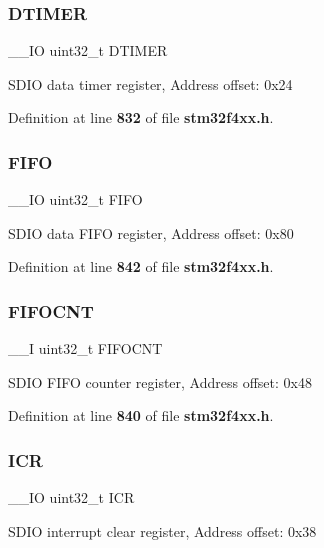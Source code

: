 \subsubsection{D\+T\+I\+M\+ER}
{\footnotesize\ttfamily \+\_\+\+\_\+\+IO uint32\+\_\+t D\+T\+I\+M\+ER}

S\+D\+IO data timer register, Address offset\+: 0x24 

Definition at line \textbf{ 832} of file \textbf{ stm32f4xx.\+h}.

\mbox{\label{structSDIO__TypeDef_a68bef1da5fd164cf0f884b4209670dc8}} 
\subsubsection{F\+I\+FO}
{\footnotesize\ttfamily \+\_\+\+\_\+\+IO uint32\+\_\+t F\+I\+FO}

S\+D\+IO data F\+I\+FO register, Address offset\+: 0x80 

Definition at line \textbf{ 842} of file \textbf{ stm32f4xx.\+h}.

\mbox{\label{structSDIO__TypeDef_ab27b78e19f487c845437c29812eecca7}} 
\subsubsection{F\+I\+F\+O\+C\+NT}
{\footnotesize\ttfamily \+\_\+\+\_\+I uint32\+\_\+t F\+I\+F\+O\+C\+NT}

S\+D\+IO F\+I\+FO counter register, Address offset\+: 0x48 

Definition at line \textbf{ 840} of file \textbf{ stm32f4xx.\+h}.

\mbox{\label{structSDIO__TypeDef_a0a8c8230846fd8ff154b9fde8dfa0399}} 
\subsubsection{I\+CR}
{\footnotesize\ttfamily \+\_\+\+\_\+\+IO uint32\+\_\+t I\+CR}

S\+D\+IO interrupt clear register, Address offset\+: 0x38 

